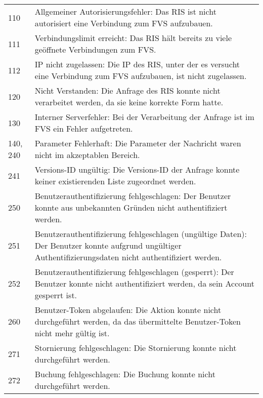\begin{flushleft}
\begin{tabularx}{\linewidth}{l>{\raggedright\arraybackslash}X} 
\toprule
110	& Allgemeiner Autorisierungsfehler: Das RIS ist nicht autorisiert eine Verbindung zum FVS aufzubauen. \\
111	& Verbindungslimit erreicht: Das RIS hält bereits zu viele geöffnete Verbindungen zum FVS. \\
112	& IP nicht zugelassen: Die IP des RIS, unter der es versucht eine Verbindung zum FVS aufzubauen, ist nicht zugelassen. \\
120	& Nicht Verstanden: Die Anfrage des RIS konnte nicht verarbeitet werden, da sie keine korrekte Form hatte. \\
130	& Interner Serverfehler: Bei der Verarbeitung der Anfrage ist im FVS ein Fehler aufgetreten. \\
140, 240 & Parameter Fehlerhaft: Die Parameter der Nachricht waren nicht im akzeptablen Bereich. \\
241	& Versions-ID ungültig: Die Versions-ID der Anfrage konnte keiner existierenden Liste zugeordnet werden. \\
250	& Benutzerauthentifizierung fehlgeschlagen: Der Benutzer konnte aus unbekannten Gründen nicht authentifiziert werden. \\
251	& Benutzerauthentifizierung fehlgeschlagen (ungültige Daten): Der Benutzer konnte aufgrund ungültiger Authentifizierungsdaten nicht authentifiziert werden. \\
252	& Benutzerauthentifizierung fehlgeschlagen (gesperrt): Der Benutzer konnte nicht authentifiziert werden, da sein Account gesperrt ist. \\
260	& Benutzer-Token abgelaufen: Die Aktion konnte nicht durchgeführt werden, da das übermittelte Benutzer-Token nicht mehr gültig ist. \\
271	& Stornierung fehlgeschlagen: Die Stornierung konnte nicht durchgeführt werden. \\
272	& Buchung fehlgeschlagen: Die Buchung konnte nicht durchgeführt werden. \\
\bottomrule
\end{tabularx}
\end{flushleft}


